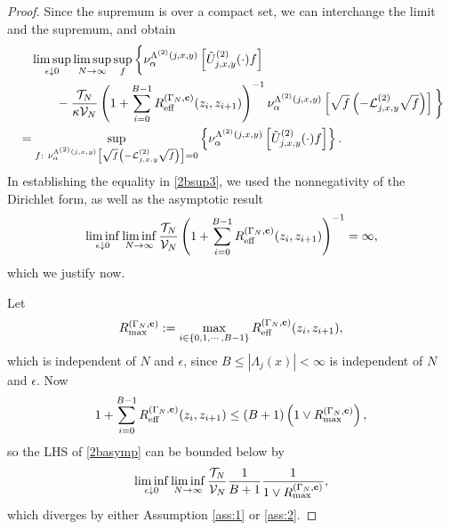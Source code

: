 \documentclass[11pt]{amsart}
\theoremstyle{plain}
\theoremstyle{definition}
\theoremstyle{remark}
\begin{document}
\begin{proof}
Since the supremum is over a compact set, we can interchange the limit and the supremum, and obtain
\begin{align}
\label{2bsup3}
& \quad\limsup_{\epsilon\downarrow 0}\limsup_{N\to\infty} \sup_f \bigg\{ \nu_\alpha^{\Lambda^{(2)}(j,x,y)}\left[ {\tilde{U}^{(2)}_{{{j}},{{x}},{{y}}}}(\cdot) f\right] \\ 
\nonumber & \qquad \quad - \frac{\mathcal{T}_N}{\kappa \mathcal{V}_N}\left(1+\sum_{i=0}^{B-1} R_{\rm eff}^{(\Gamma_N, {\bf c})}(z_i,z_{i+1})\right)^{-1} \nu_\alpha^{\Lambda^{(2)}(j,x,y)} \left[\sqrt{f}\left( -\mathcal{L}^{(2)}_{j,x,y} \sqrt{f}\right)\right]\bigg\} \\
\nonumber &= \sup_{f:~ \nu_\alpha^{\Lambda^{(2)}(j,x,y)} \left[\sqrt{f}\left( -\mathcal{L}^{(2)}_{j,x,y} \sqrt{f}\right)\right]=0} \left\{ \nu_\alpha^{\Lambda^{(2)}(j,x,y)}\left[ {\tilde{U}^{(2)}_{{{j}},{{x}},{{y}}}}(\cdot) f\right]  \right\}.
\end{align}
In establishing the equality in \eqref{2bsup3}, we used the nonnegativity of the Dirichlet form, as well as the asymptotic result
\begin{align}
\label{2basymp}
\liminf_{\epsilon \downarrow 0} \liminf_{N\to\infty}\frac{\mathcal{T}_N}{\mathcal{V}_N}\left(1+\sum_{i=0}^{B-1} R_{\rm eff}^{(\Gamma_N, {\bf c})}(z_i,z_{i+1})\right)^{-1}=\infty,
\end{align}
which we justify now. 

Let
\begin{align*}
R^{(\Gamma_N,{\bf c})}_{\max} := \max_{i\in \{0,1,\cdots, B-1\}} R_{\rm eff}^{(\Gamma_N, {\bf c})}(z_i, z_{i+1}),
\end{align*}
which is independent of $N$ and $\epsilon$, since $B\leq |\Lambda_j(x)|<\infty$ is independent of $N$ and $\epsilon$.
Now
\[
1+ \sum_{i=0}^{B-1} R_{\rm eff}^{(\Gamma_N,{\bf c})}(z_i, z_{i+1}) \leq (B+1) \left(1\vee R^{(\Gamma_N,{\bf c})}_{\max}\right),
\]
so the LHS of \eqref{2basymp} can be bounded below by
\[
\liminf_{\epsilon\downarrow 0} \liminf_{N\to\infty} \frac{\mathcal{T}_N}{\mathcal{V}_N} \frac{1}{B+1} \frac{1}{1\vee R_{\max}^{(\Gamma_N,{\bf c})}},
\]
which diverges by either Assumption \ref{ass:1} or \ref{ass:2}. 


\end{proof}
\end{document}
